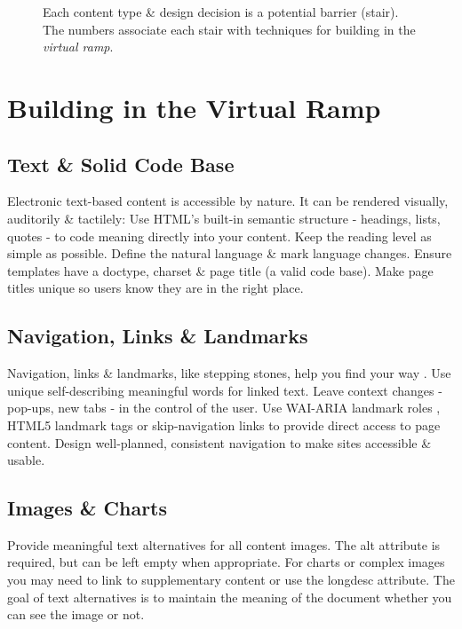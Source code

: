 \documentclass{acm_proc_article-sp}
\begin{document}
\begin{figure*}
\centering
{}
\caption{Each content type \& design decision is a potential barrier (stair). The numbers associate each stair with techniques for building in the \textit{virtual ramp}.}
\end{figure*}

\section{Building in the {\secit Virtual} Ramp}

\subsection{Text \& Solid Code Base}

Electronic text-based content is accessible by nature. It can be rendered visually, auditorily \& tactilely: Use HTML's built-in semantic structure \cite{clark:baw, horton:w4e} - headings, lists, quotes - to code meaning directly into your content. Keep the reading level as simple as possible. Define the natural language \& mark language changes. Ensure templates have a doctype, charset \& page title (a valid code base). Make page titles unique so users know they are in the right place.

\subsection{Navigation, Links \& Landmarks}
Navigation, links \& landmarks, like stepping stones, help you find your way \cite{horton:w4e}. Use unique self-describing meaningful words for linked text. Leave context changes - pop-ups, new tabs - in the control of the user. Use WAI-ARIA landmark roles \cite{horton:w4e}, HTML5 landmark tags or skip-navigation links to provide direct access to page content. Design well-planned, consistent navigation to make sites accessible \& usable.

\subsection{Images \& Charts}
Provide meaningful text alternatives for all content images. The alt attribute is required, but can be left empty when appropriate. For charts or complex images you may need to link to supplementary content or use the longdesc attribute. The goal of text alternatives is to maintain the meaning of the document whether you can see the image or not.
\end{document}

